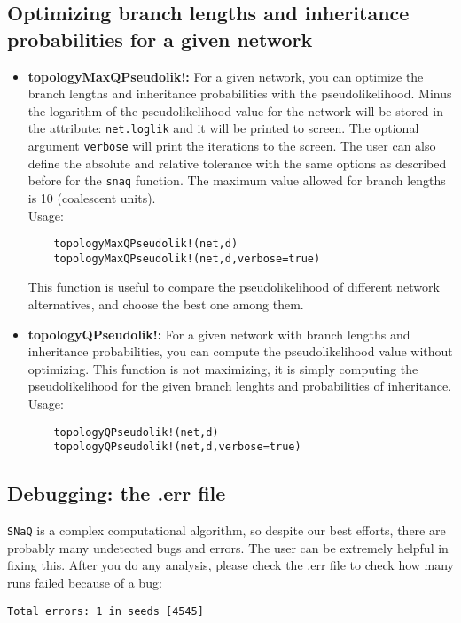 \documentclass[12pt]{article}
\begin{document}
\subsection{Optimizing branch lengths and inheritance probabilities
  for a given network}
\begin{itemize}
\item \textbf{topologyMaxQPseudolik!:} For a given network, you can
  optimize the branch lengths and inheritance probabilities with the
  pseudolikelihood. Minus the logarithm of the pseudolikelihood value
  for the network will be stored in the attribute: \texttt{net.loglik}
  and it will be printed to screen. The optional argument \texttt{verbose} will
  print the iterations to the screen. The user can also define the
  absolute and relative tolerance with the same options as described
  before for the \texttt{snaq} function. The maximum value allowed for
  branch lengths is 10 (coalescent units).
  \\
  Usage:
  \begin{lstlisting}
    topologyMaxQPseudolik!(net,d)
    topologyMaxQPseudolik!(net,d,verbose=true)
  \end{lstlisting}
  This function is useful to compare the pseudolikelihood of different
  network alternatives, and choose the best one among them.

\item \textbf{topologyQPseudolik!:} For a given network with branch
  lengths and inheritance probabilities, you can compute the
  pseudolikelihood value without optimizing. This function is not
  maximizing, it is simply computing the pseudolikelihood for the
  given branch lenghts and probabilities of inheritance.
  \\
  Usage:
  \begin{lstlisting}
    topologyQPseudolik!(net,d)
    topologyQPseudolik!(net,d,verbose=true)
  \end{lstlisting}
\end{itemize}



\subsection{Debugging: the .err file}
\texttt{SNaQ} is a complex computational algorithm, so despite our
best efforts, there are probably many undetected bugs and errors. The
user can be extremely helpful in fixing this.
After you do any analysis, please check the .err file to check how
many runs failed because of a bug:
\begin{lstlisting}
Total errors: 1 in seeds [4545]
\end{lstlisting}
\end{document}
